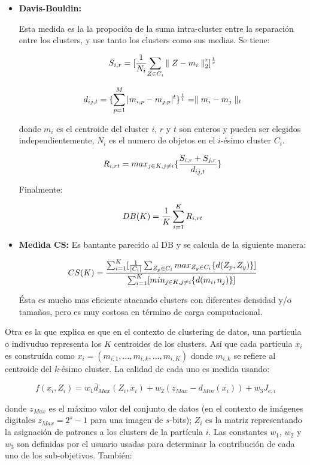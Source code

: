\begin{itemize}

\item {\bf Davis-Bouldin:}

Esta medida es la la propoci\'on de la suma intra-cluster entre
la separaci\'on entre los clusters, y use tanto los clusters como sus medias. Se tiene:

\[
S_{i,r} = {[{ { {1} \over {N_i}} {\sum_{Z \in C_i} { \parallel Z - m_i \parallel }_2^r}} ]^{1 \over r}}
\]

\[
d_{ij,t} = \{ \sum_{p=1}^M |m_{i,p} - m_{j,p}|^t \} ^{1 \over t} = \parallel m_i - m_j \parallel_t
\]

donde $m_i$ es el centroide del cluster $i$, $r$ y $t$ son enteros y pueden ser elegidos
independientemente, $N_i$ es el numero de objetos en el $i$-\'esimo cluster $C_i$.

\[
R_{i,rt} = {max_{j \in K, j \neq i} \{ {{S_{i,r} + S_{j,r}} \over {d_{ij,t}}} \}}
\]

Finalmente:

\[
DB(K) = {1 \over K} \sum_{i=1}^K R_{i,rt}
\]

\item {\bf Medida CS:} Es bantante parecido al DB y se calcula de la siguiente manera:

\[
CS(K) = {{\sum_{i=1}^K [{ 1 \over |C_i|} \sum_{Z_p \in C_i} max_{Z_y \in C_i} \{ d(Z_p,Z_y) \} ]} \over {\sum_{i=1}^K [min_{j \in K, j \neq i} \{ d(m_i, n_j) \}]}}
\]

\'Esta es mucho mas eficiente atacando clusters con diferentes densidad y/o tama\~nos,
pero es muy costosa en t\'ermino de carga computacional.

\end{itemize}

Otra es la que explica \cite{OmEnSa2005} es que en el contexto de 
clustering de datos, una partícula o indivuduo representa
los $K$ centroides de los clusters. Así que cada partícula $x_i$ es
construída como $x_i = (m_{i,1}, ..., m_{i,k}, ..., m_{i,K})$ donde
$m_{i,k}$ se refiere al centroide del $k$-ésimo cluster. La calidad
de cada uno es medida usando:

\[
f(x_i,Z_i) = w_1 \overline{d}_{Max}(Z_i,x_i) + w_2 (z_{Max} - d_{Min}(x_i)) + w_3 J_{e,i}
\]

donde $z_{Max}$ es el máximo valor del conjunto de datos (en el contexto
de imágenes digitales $z_{Max} = 2^s - 1$ para una imagen de $s$-bits);
$Z_i$ es la matriz representando la asignación de patrones a los clusters
de la partícula $i$. Las constantes $w_1$, $w_2$ y $w_3$ son definidas por el usuario
usadas para determinar la contribución de cada uno de los sub-objetivos.
También:

